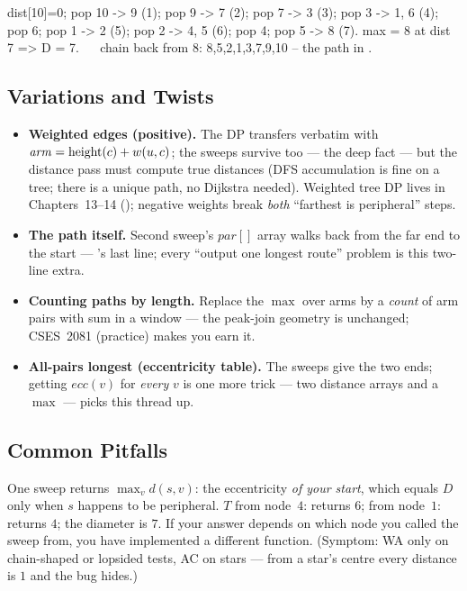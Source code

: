 \begin{tracebox}
dist[10]=0; pop 10 -> 9 (1); pop 9 -> 7 (2); pop 7 -> 3 (3); pop 3 -> 1, 6 (4);
pop 6; pop 1 -> 2 (5); pop 2 -> 4, 5 (6); pop 4; pop 5 -> 8 (7).
max = 8 at dist 7 => D = 7.  \checkmark\ \  chain back from 8:
8,5,2,1,3,7,9,10 -- the path in . \checkmark
\end{tracebox}

\subsection{Variations and Twists}

\begin{itemize}[nosep]
  \item \textbf{Weighted edges (positive).} The DP transfers verbatim with
        $\mathit{arm} = \operatorname{height}(c) + w(u,c)$; the sweeps survive too --- the deep fact ---
        but the distance pass must compute true distances (DFS accumulation is fine on a
        tree; there is a unique path, no Dijkstra needed). Weighted tree DP lives in
        Chapters~13--14 (); negative weights break \emph{both} ``farthest is
        peripheral'' steps. \hfill{}
  \item \textbf{The path itself.} Second sweep's $\mathit{par}[]$ array walks back from
        the far end to the start --- 's last line; every
        ``output one longest route'' problem is this two-line extra. \hfill{}
  \item \textbf{Counting paths by length.} Replace the $\max$ over arms by a
        \emph{count} of arm pairs with sum in a window --- the peak-join geometry is
        unchanged; CSES~2081 (practice) makes you earn it. \hfill{}
  \item \textbf{All-pairs longest (eccentricity table).} The sweeps give the two ends;
        getting $\mathit{ecc}(v)$ for \emph{every} $v$ is one more trick --- two distance
        arrays and a $\max$ ---  picks this thread up. \hfill{}
\end{itemize}

\subsection{Common Pitfalls}

\begin{warningbox}
One sweep returns $\max_v d(s,v)$: the eccentricity \emph{of your start}, which equals
$D$ only when $s$ happens to be peripheral. $T$ from node~$4$: returns $6$; from node~$1$:
returns $4$; the diameter is $7$. If your answer depends on which node you called the
sweep from, you have implemented a different function. (Symptom: WA only on chain-shaped
or lopsided tests, AC on stars --- from a star's centre every distance is $1$ and the
bug hides.)
\end{warningbox}


